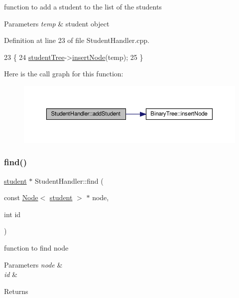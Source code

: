 function to add a student to the list of the students 
\begin{DoxyParams}{Parameters}
{\em temp} & student object \\
\hline
\end{DoxyParams}


Definition at line 23 of file Student\+Handler.\+cpp.


\begin{DoxyCode}
23                                               \{
24     \hyperlink{class_student_handler_a7141eccd57a30aa140e5b4e92b0939ea}{studentTree}->\hyperlink{class_binary_tree_a69ae782d438253d40cbd194737feca17}{insertNode}(temp);
25 \}
\end{DoxyCode}
Here is the call graph for this function\+:
\nopagebreak
\begin{figure}[H]
\begin{center}
\leavevmode
\includegraphics[width=350pt]{class_student_handler_a1d0e1f3e8383c38d5c9c5781fb8ce82d_cgraph}
\end{center}
\end{figure}
\mbox{\label{class_student_handler_a366b1628971d8b8ae437a87978e26e8a}} 
\subsubsection{\texorpdfstring{find()}{find()}}
{\footnotesize\ttfamily \hyperlink{classstudent}{student} $\ast$ Student\+Handler\+::find (\begin{DoxyParamCaption}\item[{const \hyperlink{class_node}{Node}$<$ \hyperlink{classstudent}{student} $>$ $\ast$}]{node,  }\item[{int}]{id }\end{DoxyParamCaption})\hspace{0.3cm}{\ttfamily [private]}}

function to find node 
\begin{DoxyParams}{Parameters}
{\em node} & \\
\hline
{\em id} & \\
\hline
\end{DoxyParams}
\begin{DoxyReturn}{Returns}

\end{DoxyReturn}


